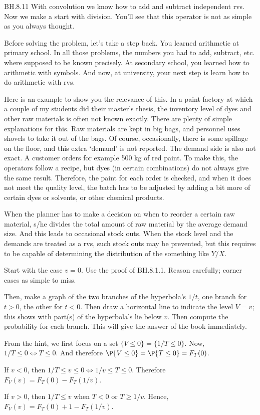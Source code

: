 
\setcounter{theorem}{10}
\begin{exercise} BH.8.11
With convolution we know how to  add and subtract independent rvs. Now we make a start with division. You'll see that this operator is not as simple as you always thought.

Before solving the problem, let's take a step back.
You learned arithmetic at primary school.
In all those problems, the numbers you had to add, subtract, etc.
where supposed to be known precisely.
At secondary school, you learned how to arithmetic with symbols.
And now, at university, your next step is learn how to do arithmetic with rvs.

Here is an example to show you the relevance of this.
In a paint factory at which a couple of my students did their master's thesis, the inventory level of dyes and other raw materials is often not known exactly.
There are plenty of simple explanations for this.
Raw materials are kept in big bags, and personnel uses shovels to take it out of the bags.
Of course, occasionally, there is some spillage on the floor, and this extra `demand' is not reported.
The demand side is also not exact.
A customer orders for example 500 kg of red paint.
To make this, the operators follow a recipe, but dyes (in certain combinations) do not always give the same  result. Therefore, the paint for each order is checked, and when it does not meet the quality level, the batch has to be adjusted by adding a bit more of certain dyes or solvents, or other chemical products.

When the planner has to make a decision on when to reorder a certain raw material, s/he divides the total amount of raw material by the average demand size. And this leads to occasional stock outs. When the stock level and the demands are treated as a rvs, such stock outs may be prevented, but this requires to be capable of determining the distribution of the something like $Y/X$.

\begin{hint}
Start with the case $v=0$. Use the proof of BH.8.1.1. Reason carefully; corner cases as simple to miss.

Then, make a graph of the two branches of the hyperbola's $1/t$, one branch for $t>0$, the other for $t<0$.
Then draw a horizontal line to indicate the level $V=v$; this shows with part(s) of the hyperbola's lie below $v$.
Then compute the probability for each branch. This will give the answer of the  book immediately.
\end{hint}
\begin{solution}

From the hint, we first focus on a set $\{V\leq 0\} = \{1/T \leq 0\}$. Now,  $1/T\leq 0 \iff T\leq 0$. And therefore $\P{V\leq 0} = \P{T\leq 0} = F_T(0)$.

If $v<0$, then $1/T \leq v \leq 0\iff 1/v \leq T \leq 0$. Therefore
$F_V(v) = F_T(0) - F_T(1/v)$.

If $v>0$, then $1/T \leq v$ when $T<0$ or $T\geq 1/v$. Hence,
$F_V(v) = F_T(0) + 1- F_T(1/v)$.
\end{solution}
\end{exercise}

